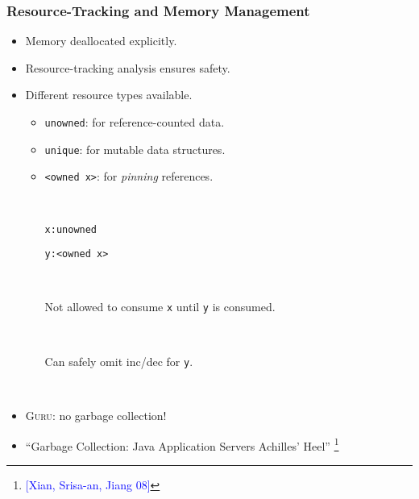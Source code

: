 \documentclass[10pt]{beamer}
\begin{document}
\begin{frame}
\frametitle{Resource-Tracking and Memory Management}

\begin{itemize}
\item Memory deallocated explicitly.
\item Resource-tracking analysis ensures safety.
\item Different resource types available.
\begin{itemize}
\item \texttt{unowned}: for reference-counted data.
\item \texttt{unique}: for mutable data structures.
\item \texttt{<owned x>}: for \emph{pinning} references.

\ 

\texttt{x:unowned}

\texttt{y:<owned x>}

\ 

Not allowed to consume \texttt{x} until \texttt{y} is consumed.

\ 

Can safely omit inc/dec for \texttt{y}.

\ 

\end{itemize}

\item \textsc{Guru}: no garbage collection!
\item ``Garbage Collection: Java Application Servers Achilles' Heel'' \footnote{\textcolor{blue}{[Xian, Srisa-an, Jiang 08]}}
\end{itemize}

\end{frame}
\end{document}
